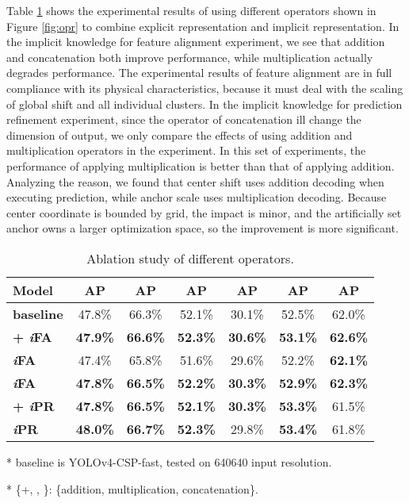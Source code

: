 \documentclass[10pt,twocolumn,letterpaper]{article}
\begin{document}
Table \ref{table:e4} shows the experimental results of using different operators shown in Figure \ref{fig:opr} to combine explicit representation and implicit representation. In the implicit knowledge for feature alignment experiment, we see that addition and concatenation both improve performance, while multiplication actually degrades performance. The experimental results of feature alignment are in full compliance with its physical characteristics, because it must deal with the scaling of global shift and all individual clusters. In the implicit knowledge for prediction refinement experiment, since the operator of concatenation ill change the dimension of output, we only compare the effects of using addition and multiplication operators in the experiment. In this set of experiments, the performance of applying multiplication is better than that of applying addition. Analyzing the reason, we found that center shift uses addition decoding when executing prediction, while anchor scale uses multiplication decoding. Because center coordinate is bounded by grid, the impact is minor, and the artificially set anchor owns a larger optimization space, so the improvement is more significant.

\begin{table}[h]
	\centering
	\begin{threeparttable}[h]
		\footnotesize
		\caption{Ablation study of different operators.}
		\label{table:e4}
		\setlength\tabcolsep{4.5pt}
		\begin{tabular}{lcccccc}
			\toprule
			\textbf{Model} & \textbf{AP} & \textbf{AP} & \textbf{AP} & \textbf{AP} & \textbf{AP} & \textbf{AP} \\				
			\midrule
			\textbf{baseline} & 47.8\% & 66.3\% & 52.1\% & 30.1\% & 52.5\% & 62.0\% \\				
			\midrule
			\textbf{+ \textit{i}FA} & \textbf{47.9\%} & \textbf{66.6\%} & \textbf{52.3\%} & \textbf{30.6\%} & \textbf{53.1\%} & \textbf{62.6\%} \\
			\textbf{ \textit{i}FA} & 47.4\% & 65.8\% & 51.6\% & 29.6\% & 52.2\% & \textbf{62.1\%} \\
			\textbf{ \textit{i}FA} & \textbf{47.8\%} & \textbf{66.5\%} & \textbf{52.2\%} & \textbf{30.3\%} & \textbf{52.9\%} & \textbf{62.3\%} \\
			\midrule
			\textbf{+ \textit{i}PR} & \textbf{47.8\%} & \textbf{66.5\%} & \textbf{52.1\%} & \textbf{30.3\%} & \textbf{53.3\%} & 61.5\% \\
			\textbf{ \textit{i}PR} & \textbf{48.0\%} & \textbf{66.7\%} & \textbf{52.3\%} & 29.8\% & \textbf{53.4\%} & 61.8\% \\
			\bottomrule
		\end{tabular}
		\begin{tablenotes}[flushleft]
			\footnotesize
			\item[*] baseline is YOLOv4-CSP-fast, tested on 640640 input resolution.
			\item[*] \{+, , \}: \{addition, multiplication, concatenation\}.
		\end{tablenotes}
	\end{threeparttable}
\end{table}
\end{document}
